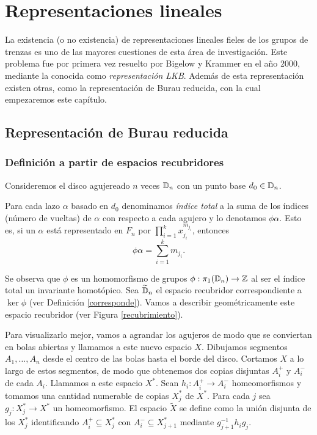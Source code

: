 \documentclass[TFG.tex]{subfiles}
\begin{document}
\chapter{Representaciones lineales}\label{capitulo4}

La existencia (o no existencia) de representaciones lineales fieles de los grupos de trenzas es uno de las mayores cuestiones de esta área de investigación. Este problema fue por primera vez resuelto por Bigelow \cite{Bigelow} y Krammer \cite{Krammer} en el año 2000, mediante la conocida como \emph{representación LKB}. Además de esta representación existen otras, como la representación de Burau reducida, con la cual empezaremos este capítulo.

\section{Representación de Burau reducida}

%

\subsection{Definición a partir de espacios recubridores}

Consideremos el disco agujereado $n$ veces $\mathbb{D}_n$ con un punto base $d_0\in\mathbb{D}_n$. 
\begin{defi}
Para cada lazo $\alpha$ basado en $d_0$ denominamos \emph{índice total}  a la suma de los índices (número de vueltas) de $\alpha$ con respecto a cada agujero y lo denotamos $\phi\alpha$. Esto es, si un $\alpha$ está representado en $F_n$ por $\prod_{i=1}^k x_{j_i}^{m_{j_i}}$, entonces 
\[
\phi\alpha=\sum_{i=1}^{k}m_{j_i}.
\]
\end{defi}

Se observa que $\phi$ es un homomorfismo de grupos $\phi:\pi_1(\mathbb{D}_n)\to\mathbb{Z}$ al ser el índice total un invariante homotópico. Sea $\widetilde{\mathbb{D}}_n$ el espacio recubridor correspondiente a $\ker\phi$ (ver Definición \ref{corresponde}). Vamos a describir geométricamente este espacio recubridor (ver Figura \ref{recubrimiento}). 


Para visualizarlo mejor, vamos a agrandar los agujeros de modo que se conviertan en bolas abiertas y llamamos a este nuevo espacio $X$. Dibujamos segmentos $A_1,\dots, A_n$ desde el centro de las bolas hasta el borde del disco. Cortamos $X$ a lo largo de estos segmentos, de modo que obtenemos dos copias disjuntas $A_i^+$ y $A_i^-$ de cada $A_i$. Llamamos a este espacio $X^*$. Sean $h_i:A_i^+\to A_i^-$ homeomorfismos y tomamos una cantidad numerable de copias $X^*_j$ de $X^*$. Para cada $j$ sea $g_j:X^*_j\to X^*$ un homeomorfismo. El espacio $\widetilde{X}$ se define como la unión disjunta de los $X^*_j$ identificando $A_i^+\subseteq X^*_j$ con $A_i^-\subseteq X^*_{j+1}$ mediante $g_{j+1}^{-1}h_ig_j$.
\end{document}
